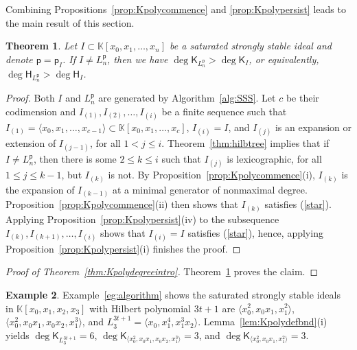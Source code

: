 \documentclass[12pt]{amsart}%
\newtheorem{theorem}{Theorem}[section]
\theoremstyle{definition}%
\newtheorem{example}[theorem]{Example}
\newcommand{\hp}{\mathsf{p}}%
\newcommand{\hs}{\mathsf{H}}%
\newcommand{\hk}{\mathsf{K}}%
\newcommand{\kk}{\mathbb{K}}%
\begin{document}
Combining Propositions~\ref{prop:Kpolycommence} and
\ref{prop:Kpolypersist} leads to the main result of this section.

\begin{theorem} 
  \label{thm:Kpolydegree}
  Let $I \subset \kk[x_0, x_1, \dotsc , x_n]$ be a saturated strongly
  stable ideal and denote $\hp = \hp_I$.  If $I \ne L^{\hp}_n$, then
  we have $\deg \hk_{L^{\hp}_n} > \deg \hk_{I}$, or equivalently,
  $\deg \hs_{L^{\hp}_n} > \deg \hs_{I}$.
\end{theorem}

\begin{proof}  
  Both $I$ and $L^{\hp}_n$ are generated by Algorithm~\ref{alg:SSS}.
  Let $c$ be their codimension and $I_{(1)}, I_{(2)}, \dotsc, I_{(i)}$
  be a finite sequence such that $I_{(1)} = \langle x_0, x_1, \dotsc,
  x_{c-1} \rangle \subset \kk[x_0, x_1, \dotsc, x_c]$, $I_{(i)} = I$,
  and $I_{(j)}$ is an expansion or extension of $I_{(j-1)}$, for all
  $1 < j \le i$.  Theorem~\ref{thm:hilbtree} implies that if $I \ne
  L^{\hp}_n$, then there is some $2 \le k \le i$ such that $I_{(j)}$
  is lexicographic, for all $1 \le j \le k-1$, but $I_{(k)}$ is not.
  By Proposition~\ref{prop:Kpolycommence}(i), $I_{(k)}$ is the
  expansion of $I_{(k-1)}$ at a minimal generator of nonmaximal
  degree.  Proposition~\ref{prop:Kpolycommence}(ii) then shows that
  $I_{(k)}$ satisfies (\ref{star}).  Applying
  Proposition~\ref{prop:Kpolypersist}(iv) to the subsequence $I_{(k)},
  I_{(k+1)}, \dotsc, I_{(i)}$ shows that $I_{(i)} = I$ satisfies
  (\ref{star}), hence, applying Proposition~\ref{prop:Kpolypersist}(i)
  finishes the proof.
\end{proof}

\begin{proof}[Proof of Theorem~\ref{thm:Kpolydegreeintro}]
  Theorem~\ref{thm:Kpolydegree} proves the claim.
\end{proof}

\begin{example}%
  \label{eg:Kpolydegree}
  Example~\ref{eg:algorithm} shows the saturated strongly stable
  ideals in $\kk[x_0, x_1, x_2, x_3]$ with Hilbert polynomial $3t+1$
  are $\langle x_0^2, x_0 x_1, x_1^2 \rangle$, $\langle x_0^2, x_0
  x_1, x_0 x_2, x_1^3 \rangle$, and $L^{3t+1}_3 = \langle x_0, x_1^4,
  x_1^3 x_2 \rangle$.  Lemma~\ref{lem:Kpolydefbnd}(i) yields $\deg
  \hk_{L^{3t+1}_3} = 6$, $\deg \hk_{\langle x_0^2, x_0 x_1, x_0 x_2,
    x_1^3 \rangle} = 3$, and $\deg \hk_{\langle x_0^2, x_0 x_1, x_1^2
    \rangle} = 3$.
\end{example}
\end{document}

